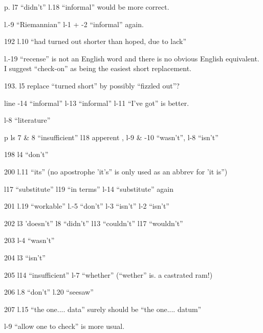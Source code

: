 

p. l7 ``didn't'' l.18 ``informal'' would be more correct.

l.-9 ``Riemannian'' l-1 + -2 ``informal'' again.

192 l.10 ``had turned out shorter than hoped, due to lack''

l.-19 ``recense'' is not an English word and there is no obvious English equivalent. I suggest ``check-on'' as being the easiest short replacement.

193. l5  replace ``turned short'' by possibly ``fizzled out''?

\reversemarginpar{} line -14 ``informal'' l-13 ``informal'' l-11 ``I've got'' is better.

l-8 ``literature''

p ls 7 \& 8 ``insufficient'' l18 apperent , l-9 \& -10 ``wasn't'', l-8 ``isn't''

198 l4 ``don't''

200 l.11 ``its'' (no apostrophe 'it's'' is only used as an abbrev for 'it is'')

l17 ``substitute'' l19 ``in terms'' l-14 ``substitute'' again

201 l.19 ``workable'' l.-5 ``don't'' l-3 ``isn't'' l-2 ``isn't''

202 l3 'doesn't'' l8 ``didn't'' l13 ``couldn't'' l17 ``wouldn't''

203 l-4 ``wasn't''

204 l3 ``isn't''

205 l14 ``insufficient'' l-7 ``whether'' (``wether'' is. a castrated ram!)

206 l.8 ``don't'' l.20 ``seesaw''

207 l.15 ``the one.... data'' surely should be ``the one.... datum''

l-9 ``allow one to check'' is more usual.\hfill{}

